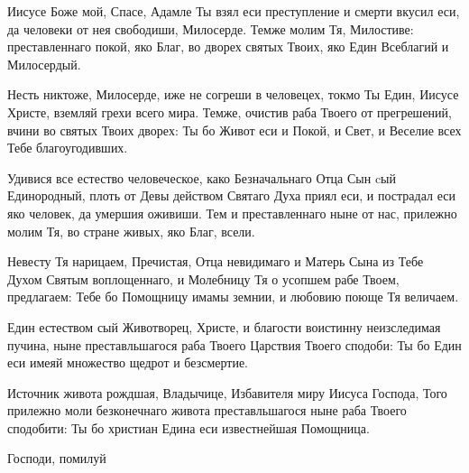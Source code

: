 \begin{mymulticols}


Иисусе Боже мой, Спасе, Адамле Ты взял еси преступление и смерти вкусил еси, да человеки от нея свободиши, Милосерде. Темже молим Тя, Милостиве: преставленнаго покой, яко Благ, во дворех святых Твоих, яко Един Всеблагий и Милосердый.


Несть никтоже, Милосерде, иже не согреши в человецех, токмо Ты Един, Иисусе Христе, вземляй грехи всего мира. Темже, очистив раба Твоего от прегрешений, вчини во святых Твоих дворех: Ты бо Живот еси и Покой, и Свет, и Веселие всех Тебе благоугодивших.

\slava

Удивися все естество человеческое, како Безначальнаго Отца Сын cый Единородный, плоть от Девы действом Святаго Духа приял еси, и пострадал еси яко человек, да умершия оживиши. Тем и преставленнаго ныне от нас, прилежно молим Тя, во стране живых, яко Благ, всели.

\inyne

Невесту Тя нарицаем, Пречистая, Отца невидимаго и Матерь Сына из Тебе Духом Святым воплощеннаго, и Молебницу Тя о усопшем рабе Твоем, предлагаем: Тебе бо Помощницу имамы земнии, и любовию поюще Тя величаем.

\Chestneyshuyu

\TrisviatoePoOtcheNash 

\vspace{\baselineskip}

Един естеством сый Животворец, Христе, и благости воистинну неизследимая пучина, ныне преставльшагося раба Твоего Царствия Твоего сподоби: Ты бо Един еси имеяй множество щедрот и безсмертие. 

\slavainyne

 Источник живота рождшая, Владычице, Избавителя миру Иисуса Господа, Того прилежно моли безконечнаго живота преставльшагося ныне раба Твоего сподобити: Ты бо христиан Едина еси известнейшая Помощница. 

Господи, помилуй  


\end{mymulticols}

